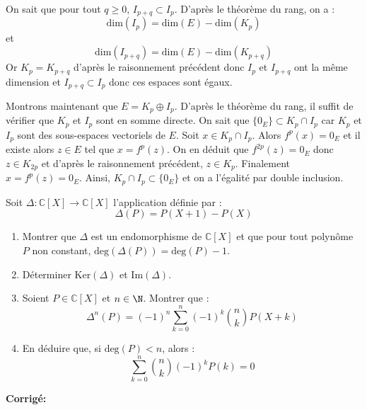 \documentclass[a4paper,twoside,french,11pt]{VcCours}
\newcommand{\corr}{\textbf{Corrigé:}}
\begin{document}
\begin{enumerate}
\noindent On sait que pour tout $q \geq 0$, $I_{p+q} \subset I_{p}$. D'après le théorème du rang, on a :
$$ \textrm{dim}(I_p) = \textrm{dim}(E) - \textrm{dim}(K_p)$$
et 
$$ \textrm{dim}(I_{p+q}) = \textrm{dim}(E) - \textrm{dim}(K_{p+q})$$
Or $K_p = K_{p+q}$ d'après le raisonnement précédent donc $I_p$ et $I_{p+q}$ ont la même dimension et $I_{p+q} \subset I_{p}$ donc ces espaces sont égaux.



\noindent Montrons maintenant que $E = K_p \oplus I_p$. D'après le théorème du rang, il suffit de vérifier que $K_p$ et $I_p$ sont en somme directe. On sait que $\lbrace 0_E \rbrace \subset  K_p \cap I_p$ car $K_p$ et $I_p$ sont des sous-espaces vectoriels de $E$. Soit $x \in  K_p \cap I_p$. Alors $f^p(x)=0_E$ et il existe alors $z \in E$ tel que $x=f^p(z)$. On en déduit que $f^{2p}(z)=0_E$ donc $z \in K_{2p}$ et d'après le raisonnement précédent, $z \in K_p$. Finalement $x=f^p(z)=0_E$. Ainsi, $K_p \cap I_p \subset \lbrace 0_E \rbrace $ et on a l'égalité par double inclusion.    

\end{enumerate}




\begin{Exercice}{} Soit $\Delta : \mathbb{C}[X] \rightarrow \mathbb{C}[X]$ l'application définie par :
  \[
  \Delta (P ) = P( X + 1 ) - P(X )
  \]
  \begin{enumerate}
  \item
    Montrer que $\Delta$ est un endomorphisme de $\mathbb{C}[X]$ et que pour tout polynôme $P$ non constant, $\textrm{deg} ( \Delta(P)) = \textrm{deg}(P) - 1$.
  \item
    Déterminer $\textrm{Ker}(\Delta)$ et $\textrm{Im}(\Delta)$.
  \item Soient $P \in \mathbb{C}[X]$ et $n \in \N$. Montrer que :
    \[
    \Delta^{n}(P) = ( - 1)^{n} \sum_{k = 0}^{n} ( - 1)^{k} \binom{n}{k}P(X + k)
    \]
  \item En déduire que, si $\textrm{deg}(P) < n$, alors :
    \[
    \sum_{k = 0}^{n} \binom{n}{k}( - 1)^{k} P(k) = 0 
    \]
  \end{enumerate}
\end{Exercice} 

\corr 
\end{document}
